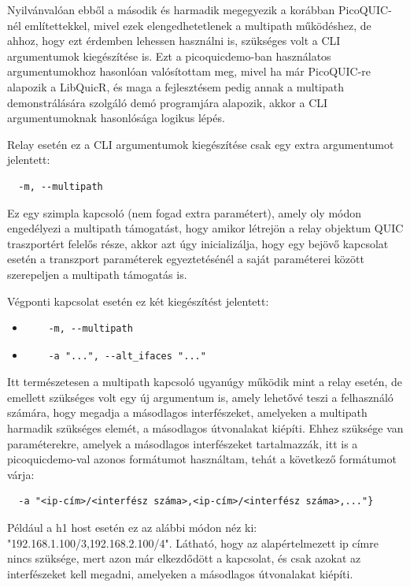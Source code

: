 \documentclass[a4paper,oneside]{article}
\begin{document}
Nyilvánvalóan ebből a második és harmadik megegyezik a korábban PicoQUIC-nél említettekkel, mivel ezek elengedhetetlenek a multipath működéshez,
de ahhoz, hogy ezt érdemben lehessen használni is, szükséges volt a CLI argumentumok kiegészítése is.
Ezt a picoquicdemo-ban használatos argumentumokhoz hasonlóan 
valósítottam meg, mivel ha már PicoQUIC-re alapozik a LibQuicR, és maga a fejlesztésem pedig annak a 
multipath demonstrálására szolgáló demó programjára alapozik, akkor a CLI argumentumoknak hasonlósága logikus lépés.

Relay esetén ez a CLI argumentumok kiegészítése csak egy extra argumentumot jelentett:
\begin{verbatim}
  -m, --multipath
\end{verbatim}
Ez egy szimpla kapcsoló (nem fogad extra paramétert), amely oly módon engedélyezi a multipath támogatást, hogy amikor létrejön a relay objektum QUIC traszportért felelős része,
akkor azt úgy inicializálja, hogy egy bejövő kapcsolat esetén a transzport paraméterek egyeztetésénél a saját paraméterei között szerepeljen a multipath támogatás is.

Végponti kapcsolat esetén ez két kiegészítést jelentett:
\begin{itemize}
  \item 
  \begin{verbatim}
    -m, --multipath
  \end{verbatim}

  \item \begin{verbatim}
    -a "...", --alt_ifaces "..."
  \end{verbatim}
\end{itemize}

Itt természetesen a multipath kapcsoló ugyanúgy működik mint a relay esetén,
de emellett szükséges volt egy új argumentum is, amely lehetővé teszi a felhasználó számára, hogy megadja a másodlagos interfészeket,
amelyeken a multipath harmadik szükséges elemét, a másodlagos útvonalakat kiépíti. Ehhez szüksége van paraméterekre, amelyek a másodlagos interfészeket
tartalmazzák, itt is a picoquicdemo-val azonos formátumot használtam, tehát a következő formátumot várja:
\begin{verbatim}
  -a "<ip-cím>/<interfész száma>,<ip-cím>/<interfész száma>,..."}
\end{verbatim}
Például a h1 host esetén ez az alábbi módon néz ki: "192.168.1.100/3,192.168.2.100/4". Látható, hogy az alapértelmezett ip címre nincs 
szüksége, mert azon már elkezdődött a kapcsolat, és csak azokat az interfészeket kell megadni, amelyeken a másodlagos útvonalakat kiépíti. 
\end{document}
